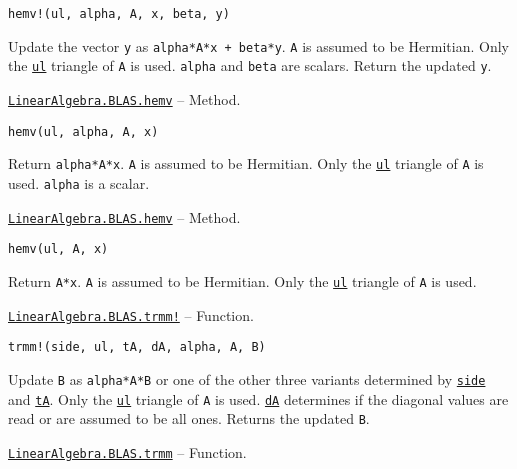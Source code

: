 \begin{adjustwidth}{2em}{0pt}


\begin{verbatim}
hemv!(ul, alpha, A, x, beta, y)
\end{verbatim}

Update the vector \texttt{y} as \texttt{alpha*A*x + beta*y}. \texttt{A} is assumed to be Hermitian. Only the \hyperlink{13880289478825450693}{\texttt{ul}} triangle of \texttt{A} is used. \texttt{alpha} and \texttt{beta} are scalars. Return the updated \texttt{y}.



\end{adjustwidth}
\hypertarget{6944896949603577091}{} 
\hyperlink{6944896949603577091}{\texttt{LinearAlgebra.BLAS.hemv}}  -- {Method.}

\begin{adjustwidth}{2em}{0pt}


\begin{verbatim}
hemv(ul, alpha, A, x)
\end{verbatim}

Return \texttt{alpha*A*x}. \texttt{A} is assumed to be Hermitian. Only the \hyperlink{13880289478825450693}{\texttt{ul}} triangle of \texttt{A} is used. \texttt{alpha} is a scalar.



\end{adjustwidth}
\hypertarget{9526750005879662729}{} 
\hyperlink{9526750005879662729}{\texttt{LinearAlgebra.BLAS.hemv}}  -- {Method.}

\begin{adjustwidth}{2em}{0pt}


\begin{verbatim}
hemv(ul, A, x)
\end{verbatim}

Return \texttt{A*x}. \texttt{A} is assumed to be Hermitian. Only the \hyperlink{13880289478825450693}{\texttt{ul}} triangle of \texttt{A} is used.



\end{adjustwidth}
\hypertarget{8591334681358631512}{} 
\hyperlink{8591334681358631512}{\texttt{LinearAlgebra.BLAS.trmm!}}  -- {Function.}

\begin{adjustwidth}{2em}{0pt}


\begin{verbatim}
trmm!(side, ul, tA, dA, alpha, A, B)
\end{verbatim}

Update \texttt{B} as \texttt{alpha*A*B} or one of the other three variants determined by \hyperlink{3128026147631247774}{\texttt{side}} and \hyperlink{15951037910221396131}{\texttt{tA}}. Only the \hyperlink{13880289478825450693}{\texttt{ul}} triangle of \texttt{A} is used. \hyperlink{285101993251198425}{\texttt{dA}} determines if the diagonal values are read or are assumed to be all ones. Returns the updated \texttt{B}.



\end{adjustwidth}
\hypertarget{1143998968915321685}{} 
\hyperlink{1143998968915321685}{\texttt{LinearAlgebra.BLAS.trmm}}  -- {Function.}

